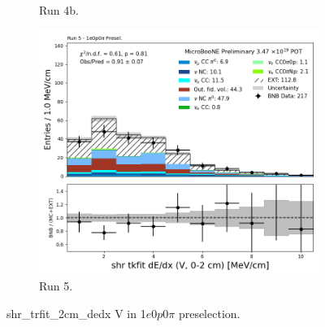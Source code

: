 \begin{figure}[H]
\begin{subfigure}[t]{0.32\linewidth}
        \caption{Run 4b.}
    \end{subfigure}%
    \hspace{0.2cm}%
    \begin{subfigure}[t]{0.32\linewidth}
        \includegraphics[width=\linewidth]{technote/Appendix_Preselection/Figures/1e0p0pi/Run5/shr_tkfit_2cm_dedx_V_Run5_1e0p0pi_Presel.png}
        \caption{Run 5.}
    \end{subfigure}
    \caption{shr\_trfit\_2cm\_dedx V in 1$e$0$p$0$\pi$ preselection.}
\end{figure}

